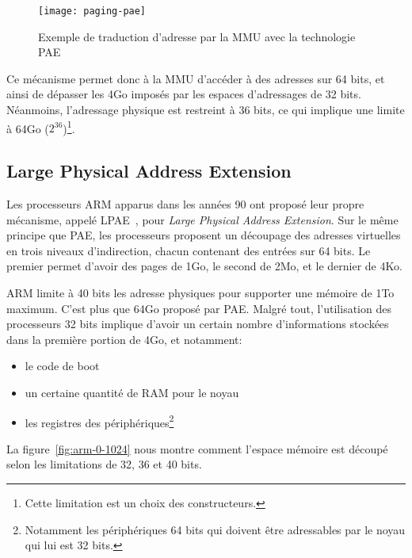       \begin{figure}[ht]
        \centering \texttt{[image: paging-pae]}
        \caption{Exemple de traduction d'adresse par la MMU avec la technologie
          PAE}
        \label{fig:paging-pae}
      \end{figure}
      
      Ce mécanisme permet donc à la MMU d'accéder à des adresses sur 64 bits, et
      ainsi de dépasser les 4Go imposés par les espaces d'adressages de 32
      bits. Néanmoins, l'adressage physique est restreint à 36 bits, ce qui
      implique une limite à 64Go ($2^{36}$)\footnote{Cette limitation est un
        choix des constructeurs.}.


    \subsection{Large Physical Address Extension}

      Les processeurs ARM apparus dans les années 90 ont proposé leur propre
      mécanisme, appelé
      LPAE~\citep{arm2012principles,marinas2011linux}, pour \textit{Large Physical Address
        Extension}. Sur le même principe que PAE, les processeurs proposent un
      découpage des adresses virtuelles en trois niveaux d'indirection, chacun
      contenant des entrées sur 64 bits. Le premier permet d'avoir des pages de
      1Go, le second de 2Mo, et le dernier de 4Ko.

      ARM limite à 40 bits les adresse physiques pour supporter une mémoire de
      1To maximum. C'est plus que 64Go proposé par PAE. Malgré tout,
      l'utilisation des processeurs 32 bits implique d'avoir un certain nombre
      d'informations stockées dans la première portion de 4Go, et notamment:

      \begin{itemize}
        \item le code de boot
        \item un certaine quantité de RAM pour le noyau
        \item les registres des périphériques\footnote{Notamment les
          périphériques 64 bits qui doivent être adressables par le noyau qui
          lui est 32 bits.}
      \end{itemize}

      La figure~\ref{fig:arm-0-1024} nous montre comment l'espace mémoire est
      découpé selon les limitations de 32, 36 et 40 bits.

